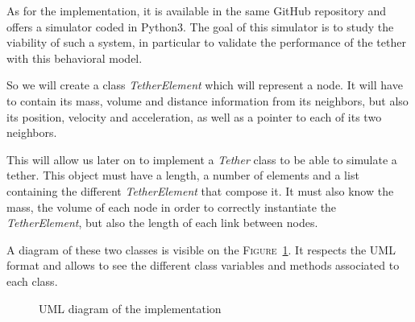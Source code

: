 As for the implementation, it is available in the same GitHub repository and offers a simulator coded in Python3. The goal of this simulator is to study the viability of such a system, in particular to validate the performance of the tether with this behavioral model.

So we will create a class \textit{TetherElement} which will represent a node. It will have to contain its mass, volume and distance information from its neighbors, but also its position, velocity and acceleration, as well as a pointer to each of its two neighbors.

This will allow us later on to implement a \textit{Tether} class to be able to simulate a tether. This object must have a length, a number of elements and a list containing the different \textit{TetherElement} that compose it. It must also know the mass, the volume of each node in order to correctly instantiate the \textit{TetherElement}, but also the length of each link between nodes.

A diagram of these two classes is visible on the \textsc{Figure}~\ref{fig:uml}. It respects the \textsc{UML} format and allows to see the different class variables and methods associated to each class.

\begin{figure}
    \centering
    \caption{UML diagram of the implementation}
    \label{fig:uml}
\end{figure}
